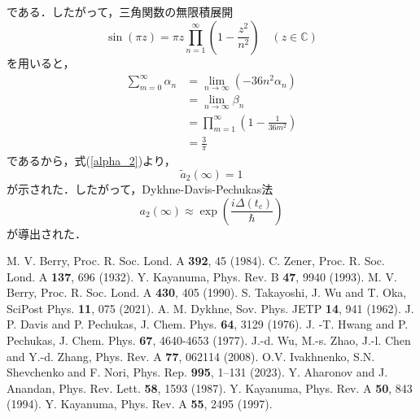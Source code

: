 \documentclass[a4paper, titlepage]{jsreport}
\begin{document}
である．したがって，三角関数の無限積展開
\begin{equation}
  \sin (\pi z) = \pi z \prod_{n=1}^{\infty} \left( 1-\frac{z^2}{n^2} \right) \quad (z \in \mathbb{C})
\end{equation}
を用いると，
\begin{align}
  \sum_{m=0}^{\infty} \alpha_n
  &= \lim_{n \rightarrow \infty} (-36n^2 \alpha_n)\\
  &= \lim_{n \rightarrow \infty} \beta_n\\
  &= \prod_{m=1}^{\infty} \left( 1-\frac{1}{36m^2} \right)\\
  &= \frac{3}{\pi}
\end{align}
であるから，式(\ref{alpha_2})より，
\begin{equation}
  \tilde{a}_2(\infty) = 1
\end{equation}
が示された．したがって，Dykhne-Davis-Pechukas法
\begin{equation}
  a_2(\infty) \approx \exp \left( \frac{i\Delta(t_c)}{\hbar} \right)
\end{equation}
が導出された．



\begin{thebibliography}{99}
    M. V. Berry, Proc. R. Soc. Lond. A {\bf 392}, 45 (1984).
   C. Zener, Proc. R. Soc. Lond. A {\bf 137}, 696 (1932).
   Y. Kayanuma, Phys. Rev. B {\bf 47}, 9940 (1993).
   M. V. Berry, Proc. R. Soc. Lond. A {\bf 430}, 405 (1990).
   S. Takayoshi, J. Wu and T. Oka, SciPost Phys. {\bf 11}, 075 (2021).
   A. M. Dykhne, Sov. Phys. JETP {\bf 14}, 941 (1962).
   J. P. Davis and P. Pechukas, J. Chem. Phys. {\bf 64}, 3129 (1976).
   J. -T. Hwang and P. Pechukas, J. Chem. Phys. {\bf 67}, 4640-4653 (1977).
   J.-d. Wu, M.-s. Zhao, J.-l. Chen and Y.-d. Zhang, Phys. Rev. A {\bf 77}, 062114 (2008).
   O.V. Ivakhnenko, S.N. Shevchenko and F. Nori, Phys. Rep. {\bf 995}, 1–131 (2023).
   Y. Aharonov and J. Anandan, Phys. Rev. Lett. {\bf 58}, 1593 (1987).
   Y. Kayanuma, Phys. Rev. A {\bf 50}, 843 (1994).
   Y. Kayanuma, Phys. Rev. A {\bf 55}, 2495 (1997).
\end{thebibliography}
\end{document}
